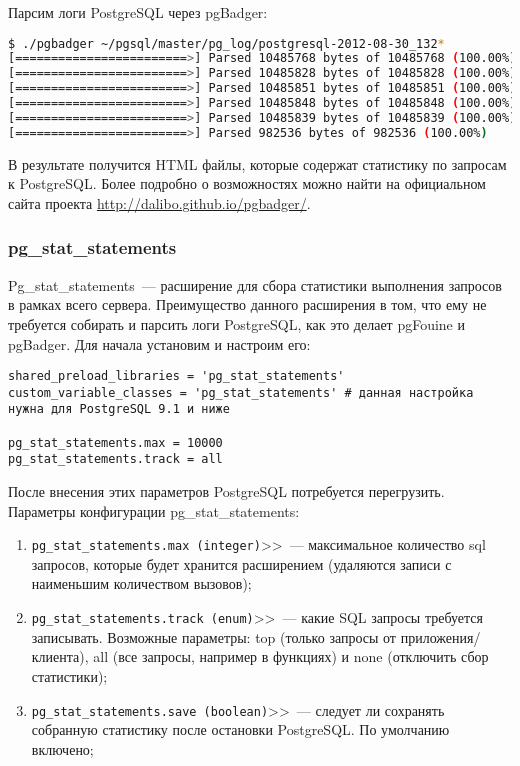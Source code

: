 Парсим логи PostgreSQL через pgBadger:

\begin{lstlisting}[language=Bash,label=lst:sql_performance11,caption=Запуск pgBadger]
$ ./pgbadger ~/pgsql/master/pg_log/postgresql-2012-08-30_132*
[========================>] Parsed 10485768 bytes of 10485768 (100.00%)
[========================>] Parsed 10485828 bytes of 10485828 (100.00%)
[========================>] Parsed 10485851 bytes of 10485851 (100.00%)
[========================>] Parsed 10485848 bytes of 10485848 (100.00%)
[========================>] Parsed 10485839 bytes of 10485839 (100.00%)
[========================>] Parsed 982536 bytes of 982536 (100.00%)
\end{lstlisting}

В результате получится HTML файлы, которые содержат статистику по запросам к PostgreSQL. Более подробно о возможностях можно найти на официальном сайта проекта \href{http://dalibo.github.io/pgbadger/}{http://dalibo.github.io/pgbadger/}.

\subsubsection{pg\_stat\_statements}

Pg\_stat\_statements~--- расширение для сбора статистики выполнения запросов в рамках всего сервера. Преимущество данного расширения в том, что ему не требуется собирать и парсить логи PostgreSQL, как это делает pgFouine и pgBadger. Для начала установим и настроим его:

\begin{lstlisting}[label=lst:sql_performance12,caption=Настройка pg\_stat\_statements в postgresql.conf]
shared_preload_libraries = 'pg_stat_statements'
custom_variable_classes = 'pg_stat_statements' # данная настройка нужна для PostgreSQL 9.1 и ниже

pg_stat_statements.max = 10000
pg_stat_statements.track = all
\end{lstlisting}

После внесения этих параметров PostgreSQL потребуется перегрузить. Параметры конфигурации pg\_stat\_statements:

\begin{enumerate}
  \item \lstinline!pg_stat_statements.max (integer)!>>~--- максимальное количество sql запросов, которые будет хранится расширением (удаляются записи с наименьшим количеством вызовов);
  \item \lstinline!pg_stat_statements.track (enum)!>>~--- какие SQL запросы требуется записывать. Возможные параметры: top (только запросы от приложения/клиента), all (все запросы, например в функциях) и none (отключить сбор статистики);
  \item \lstinline!pg_stat_statements.save (boolean)!>>~--- следует ли сохранять собранную статистику после остановки PostgreSQL. По умолчанию включено;
\end{enumerate}

